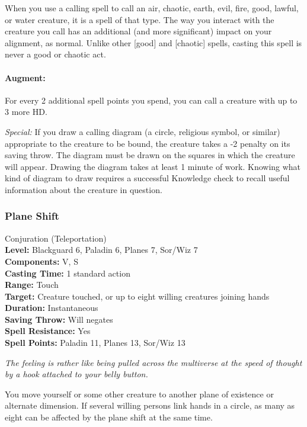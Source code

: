 When you use a calling spell to call an air, chaotic, earth, evil, fire, good, lawful, or water creature, it is a spell of that type.
The way you interact with the creature you call has an additional (and more significant) impact on your alignment, as normal.
Unlike other [good] and [chaotic] spells, casting this spell is never a good or chaotic act.

\paragraph{Augment:} For every 2 additional spell points you spend, you can call a creature with up to 3 more HD.

\emph{Special:} If you draw a calling diagram (a circle, religious symbol, or similar) appropriate to the creature to be bound,
the creature takes a -2 penalty on its saving throw.
The diagram must be drawn on the squares in which the creature will appear.
Drawing the diagram takes at least 1 minute of work. 
Knowing what kind of diagram to draw requires a successful Knowledge check to recall useful information about the creature in question.
\subsubsection{Plane Shift}
\label{Spell:PlaneShift}
Conjuration (Teleportation)
\\ \textbf{Level:} Blackguard 6, Paladin 6, Planes 7, Sor/Wiz 7
\\ \textbf{Components:} V, S
\\ \textbf{Casting Time:} 1 standard action
\\ \textbf{Range:} Touch
\\ \textbf{Target:} Creature touched, or up to eight willing creatures joining hands
\\ \textbf{Duration:} Instantaneous
\\ \textbf{Saving Throw:} Will negates
\\ \textbf{Spell Resistance:} Yes
\\ \textbf{Spell Points:} Paladin 11, Planes 13, Sor/Wiz 13

\emph{The feeling is rather like being pulled across the multiverse at the speed of thought by a hook attached to your belly button.}

You move yourself or some other creature to another plane of existence or alternate dimension. 
If several willing persons link hands in a circle, as many as eight can be affected by the plane shift at the same time. 

